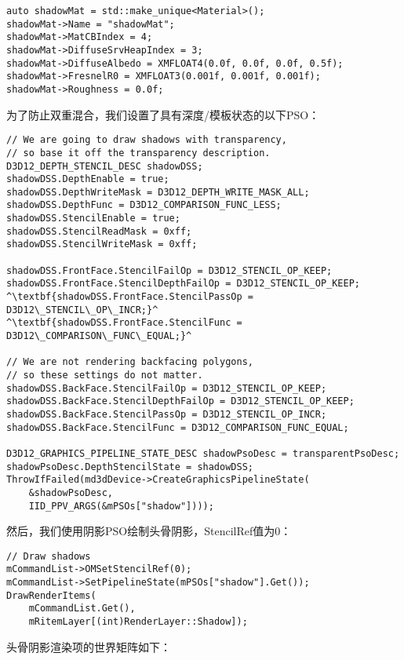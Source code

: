 \begin{lstlisting}
auto shadowMat = std::make_unique<Material>();
shadowMat->Name = "shadowMat";
shadowMat->MatCBIndex = 4;
shadowMat->DiffuseSrvHeapIndex = 3;
shadowMat->DiffuseAlbedo = XMFLOAT4(0.0f, 0.0f, 0.0f, 0.5f);
shadowMat->FresnelR0 = XMFLOAT3(0.001f, 0.001f, 0.001f);
shadowMat->Roughness = 0.0f;
\end{lstlisting}

\begin{flushleft}
为了防止双重混合，我们设置了具有深度/模板状态的以下PSO：\\
\end{flushleft}

\begin{lstlisting}[escapechar=^]
// We are going to draw shadows with transparency, 
// so base it off the transparency description.
D3D12_DEPTH_STENCIL_DESC shadowDSS;
shadowDSS.DepthEnable = true;
shadowDSS.DepthWriteMask = D3D12_DEPTH_WRITE_MASK_ALL;
shadowDSS.DepthFunc = D3D12_COMPARISON_FUNC_LESS;
shadowDSS.StencilEnable = true;
shadowDSS.StencilReadMask = 0xff;
shadowDSS.StencilWriteMask = 0xff;

shadowDSS.FrontFace.StencilFailOp = D3D12_STENCIL_OP_KEEP;
shadowDSS.FrontFace.StencilDepthFailOp = D3D12_STENCIL_OP_KEEP;
^\textbf{shadowDSS.FrontFace.StencilPassOp = D3D12\_STENCIL\_OP\_INCR;}^
^\textbf{shadowDSS.FrontFace.StencilFunc = D3D12\_COMPARISON\_FUNC\_EQUAL;}^

// We are not rendering backfacing polygons, 
// so these settings do not matter.
shadowDSS.BackFace.StencilFailOp = D3D12_STENCIL_OP_KEEP;
shadowDSS.BackFace.StencilDepthFailOp = D3D12_STENCIL_OP_KEEP;
shadowDSS.BackFace.StencilPassOp = D3D12_STENCIL_OP_INCR;
shadowDSS.BackFace.StencilFunc = D3D12_COMPARISON_FUNC_EQUAL;

D3D12_GRAPHICS_PIPELINE_STATE_DESC shadowPsoDesc = transparentPsoDesc;
shadowPsoDesc.DepthStencilState = shadowDSS;
ThrowIfFailed(md3dDevice->CreateGraphicsPipelineState(
    &shadowPsoDesc, 
    IID_PPV_ARGS(&mPSOs["shadow"])));
\end{lstlisting}

\begin{flushleft}
然后，我们使用阴影PSO绘制头骨阴影，StencilRef值为0：\\
\end{flushleft}

\begin{lstlisting}
// Draw shadows
mCommandList->OMSetStencilRef(0);
mCommandList->SetPipelineState(mPSOs["shadow"].Get());
DrawRenderItems(
    mCommandList.Get(),
    mRitemLayer[(int)RenderLayer::Shadow]);
\end{lstlisting}
\begin{flushleft}
头骨阴影渲染项的世界矩阵如下：\\
\end{flushleft}

